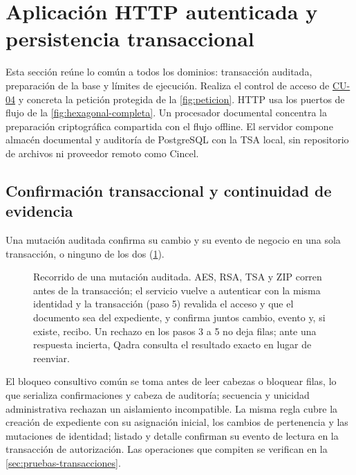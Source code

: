 
\section{Aplicación HTTP autenticada y persistencia transaccional}\label{sec:impl-http}

Esta sección reúne lo común a todos los dominios: transacción auditada, preparación de la base y límites de ejecución. Realiza el control de acceso de \hyperref[tab:cu-04]{CU-04} y concreta la petición protegida de la \cref{fig:peticion}. HTTP usa los puertos de flujo de la \cref{fig:hexagonal-completa}. Un procesador documental concentra la preparación criptográfica compartida con el flujo offline. El servidor compone almacén documental y auditoría de PostgreSQL con la TSA local, sin repositorio de archivos ni proveedor remoto como Cincel.

\subsection{Confirmación transaccional y continuidad de evidencia}\label{sec:impl-http-transacciones}

Una mutación auditada confirma su cambio y su evento de negocio en una sola transacción, o ninguno de los dos (\cref{fig:impl-operacion-auditada}).

\begin{figure}[!htbp]
  \centering
  
  \caption{Recorrido de una mutación auditada. AES, RSA, TSA y ZIP corren antes de la transacción; el servicio vuelve a autenticar con la misma identidad y la transacción (paso 5) revalida el acceso y que el documento sea del expediente, y confirma juntos cambio, evento y, si existe, recibo. Un rechazo en los pasos 3 a 5 no deja filas; ante una respuesta incierta, Qadra consulta el resultado exacto en lugar de reenviar.}
  \label{fig:impl-operacion-auditada}
\end{figure}

El bloqueo consultivo común se toma antes de leer cabezas o bloquear filas, lo que serializa confirmaciones y cabeza de auditoría; secuencia y unicidad administrativa rechazan un aislamiento incompatible. La misma regla cubre la creación de expediente con su asignación inicial, los cambios de pertenencia y las mutaciones de identidad; listado y detalle confirman su evento de lectura en la transacción de autorización. Las operaciones que compiten se verifican en la \cref{sec:pruebas-transacciones}.

